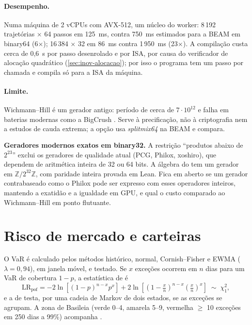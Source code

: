 \paragraph{Desempenho.} Numa máquina de 2 vCPUs com AVX-512, um núcleo do worker: 8\,192 trajetórias $\times$ 64 passos em 125~ms, contra 750~ms estimados para a BEAM em binary64 (6$\times$); 16\,384 $\times$ 32 em 86~ms contra 1\,950~ms (23$\times$). A compilação custa cerca de 0,6~s por passo desenrolado e por ISA, por causa do verificador de alocação quadrático (\autoref{sec:inov-alocacao}); por isso o programa tem um passo por chamada e compila só para a ISA da máquina.

\paragraph{Limite.} Wichmann--Hill é um gerador antigo: período de cerca de $7 \cdot 10^{12}$ e falha em baterias modernas como a BigCrush \cite{lecuyer2007}. Serve à precificação, não à criptografia nem a estudos de cauda extrema; a opção  usa \textit{splitmix64} na BEAM e compara.

\begin{doutorado}
\textbf{Geradores modernos exatos em binary32.} A restrição ``produtos abaixo de $2^{23}$'' exclui os geradores de qualidade atual (PCG, Philox, xoshiro), que dependem de aritmética inteira de 32 ou 64 bits. A álgebra do \vapor{} tem um gerador  em $\mathbb{Z}/2^{32}\mathbb{Z}$, com paridade inteira provada em Lean. Fica em aberto se um gerador contrabaseado como o Philox \cite{salmon2011} pode ser expresso com esses operadores inteiros, mantendo a exatidão e a igualdade em GPU, e qual o custo comparado ao Wichmann--Hill em ponto flutuante.
\end{doutorado}

\section{Risco de mercado e carteiras}\label{sec:fin-risco}

O VaR é calculado pelos métodos histórico, normal, Cornish--Fisher e EWMA ($\lambda = 0{,}94$), em janela móvel, e testado. Se $x$ exceções ocorrem em $n$ dias para um VaR de cobertura $1 - p$, a estatística de  é
\begin{equation}
  \mathrm{LR}_{\mathrm{pof}} = -2 \ln\!\left[(1-p)^{n-x} p^{x}\right] + 2 \ln\!\left[\left(1 - \tfrac{x}{n}\right)^{n-x}\left(\tfrac{x}{n}\right)^{x}\right] \;\sim\; \chi^2_1,
\end{equation}
e a de  testa, por uma cadeia de Markov de dois estados, se as exceções se agrupam. A zona de Basileia (verde 0--4, amarela 5--9, vermelha $\geq$ 10 exceções em 250 dias a 99\%) acompanha \cite{basel1996}.

